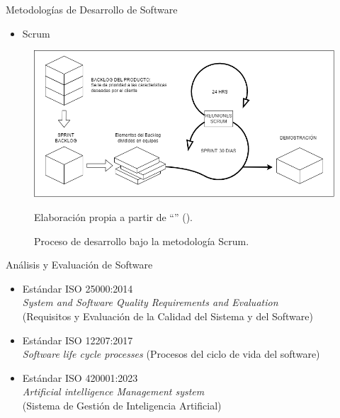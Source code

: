 \documentclass[spanish, aspectratio=169]{beamer}
\begin{document}
\begin{frame}[allowframebreaks]{Metodologías de Desarrollo de Software}
    \begin{itemize}
        \item Scrum
    \end{itemize}

    \begin{figure}
      \centering
      \includegraphics[width=.75\textwidth]{../images/marcoteorico/modelo_scrum.png}
      \caption{Proceso de desarrollo bajo la metodología Scrum.}
        \vspace{-0.2cm}
      \footnotesize{{Elaboración propia a partir de ``\textit{}'' (\citeyear{pressman2005software}).}}
      \label{fig:modelo_desarrollo_scrum} 
    \end{figure}

\end{frame}

\begin{frame}{Análisis y Evaluación de Software}
  \begin{itemize}
      \item Estándar ISO 25000:2014 \\
      \quad \textit{System and Software Quality Requirements and Evaluation}\\
      \quad (Requisitos y Evaluación de la Calidad del Sistema y del Software)
      \item Estándar ISO 12207:2017 \\ 
      \quad \textit{Software life cycle processes} (Procesos del ciclo de vida del software)
      \item Estándar ISO 420001:2023 \\  
      \quad \textit{Artificial intelligence Management system}\\ 
      \quad(Sistema de Gestión de Inteligencia Artificial)
  \end{itemize}
\end{frame}
\end{document}
